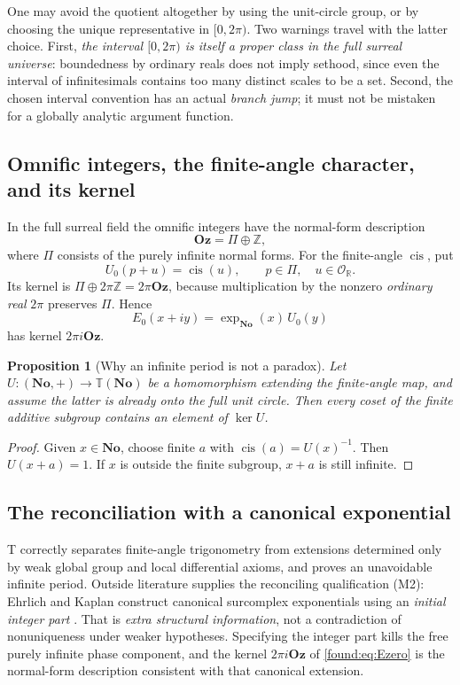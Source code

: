 \documentclass[11pt,letterpaper]{article}
\numberwithin{equation}{section}
\newtheorem{proposition}[theorem]{Proposition}
\theoremstyle{definition}
\theoremstyle{remark}
\newcommand{\No}{\mathbf{No}}
\newcommand{\Oz}{\mathbf{Oz}}
\newcommand{\R}{\mathbb R}
\newcommand{\Z}{\mathbb Z}
\newcommand{\OO}{\mathcal O}
\newcommand{\cis}{\operatorname{cis}}
\begin{document}
One may avoid the quotient altogether by using the unit-circle group, or by
choosing the unique representative in $[0,2\pi)$. Two warnings travel with the
latter choice. First, \emph{the interval $[0,2\pi)$ is itself a proper class in
the full surreal universe}: boundedness by ordinary reals does not imply
sethood, since even the interval of infinitesimals contains too many distinct
scales to be a set. Second, the chosen interval convention has an actual
\emph{branch jump}; it must not be mistaken for a globally analytic argument
function.

\subsection{Omnific integers, the finite-angle character, and its kernel}
\label{found:sub:omnific}
In the full surreal field the omnific integers have the normal-form description
\begin{equation}\label{found:eq:omnific}
 \Oz=\Pi\oplus\Z,
\end{equation}
where $\Pi$ consists of the purely infinite normal forms. For the finite-angle
$\cis$, put
\begin{equation}\label{found:eq:Uzero}
 U_0(p+u)=\cis(u),\qquad p\in\Pi,\quad u\in\OO_\R .
\end{equation}
Its kernel is $\Pi\oplus2\pi\Z=2\pi\Oz$, because multiplication by the nonzero
\emph{ordinary real} $2\pi$ preserves $\Pi$. Hence
\begin{equation}\label{found:eq:Ezero}
 E_0(x+iy)=\exp_{\No}(x)\,U_0(y)
\end{equation}
has kernel $2\pi i\Oz$.

\begin{proposition}[Why an infinite period is not a paradox]\label{found:prop:period}
Let $U:(\No,+)\to\mathbb T(\No)$ be a homomorphism extending the finite-angle
map, and assume the latter is already onto the full unit circle. Then every
coset of the finite additive subgroup contains an element of $\ker U$.
\end{proposition}
\begin{proof}
Given $x\in\No$, choose finite $a$ with $\cis(a)=U(x)^{-1}$. Then $U(x+a)=1$.
If $x$ is outside the finite subgroup, $x+a$ is still infinite.
\end{proof}

\subsection{The reconciliation with a canonical exponential}
\label{found:sub:canonicalexp}
T correctly separates finite-angle trigonometry from extensions determined only
by weak global group and local differential axioms, and proves an unavoidable
infinite period. Outside literature supplies the reconciling qualification (M2):
Ehrlich and Kaplan construct canonical surcomplex exponentials using an
\emph{initial integer part} \cite{found:EhrlichKaplanExp}. That is \emph{extra
structural information}, not a contradiction of nonuniqueness under weaker
hypotheses. Specifying the integer part kills the free purely infinite phase
component, and the kernel $2\pi i\Oz$ of \eqref{found:eq:Ezero} is the
normal-form description consistent with that canonical extension.
\end{document}
